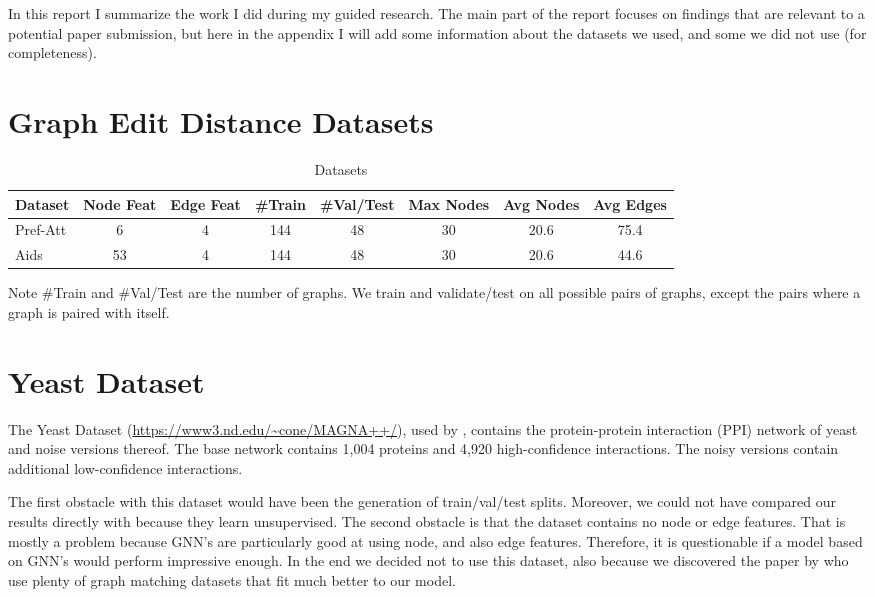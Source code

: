 \appendix
\appendixpage

In this report I summarize the work I did during my guided research. The main part of the report focuses on findings that are relevant to a potential paper submission, but here in the appendix I will add some information about the datasets we used, and some we did not use (for completeness).


\section{Graph Edit Distance Datasets}
\begin{table}[htbp]
    \addtolength{\tabcolsep}{-1pt}
    \fontsize{9pt}{10.25pt}\selectfont
    \centering
    \renewcommand{\arraystretch}{1.2}
    \begin{tabular}{|l|c|c|c|c|c|c|c|}
        \hline
        Dataset & Node Feat & Edge Feat & \#Train & \#Val/Test & Max Nodes & Avg Nodes & Avg Edges \\
        \hline
        Pref-Att & 6 & 4 & 144 & 48 & 30 & 20.6 & 75.4 \\ %
        \hline
        Aids & 53 & 4 & 144 & 48 & 30 & 20.6 & 44.6 \\ %
        \hline
    \end{tabular}
    \caption{Datasets}
    \label{tab:ex1-data}
\end{table}

Note \#Train and \#Val/Test are the number of graphs. We train and validate/test on all possible pairs of graphs, except the pairs where a graph is paired with itself.

\section{Yeast Dataset}

The Yeast Dataset (\url{https://www3.nd.edu/~cone/MAGNA++/}), used by \cite{yeast2019}, contains the protein-protein interaction (PPI) network of yeast and noise versions thereof. The base network contains 1,004 proteins and 4,920 high-confidence interactions. The noisy versions contain additional low-confidence interactions.

The first obstacle with this dataset would have been the generation of train/val/test splits.  Moreover, we could not have compared our results directly with \cite{yeast2019} because they learn unsupervised. The second obstacle is that the dataset contains no node or edge features. That is mostly a problem because GNN's are particularly good at using node, and also edge features. Therefore, it is questionable if a  model based on GNN's would perform impressive enough. In the end we decided not to use this dataset, also because we discovered the paper by \cite{fey2020_update} who use plenty of graph matching datasets that fit much better to our model.

